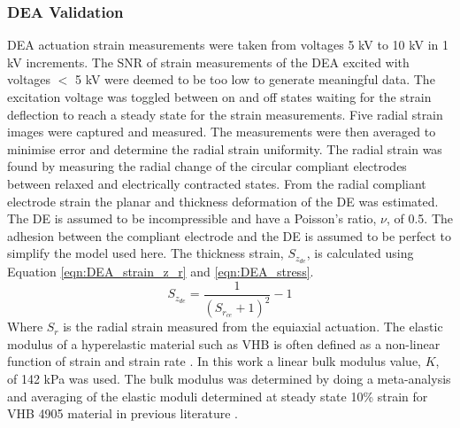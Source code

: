 \subsubsection{DEA Validation} %
\label{subsubsec:dea_validation1}
DEA actuation strain measurements were taken from voltages 5 kV to 10 kV in 1 kV increments. The SNR of strain measurements of the DEA excited with voltages $<$ 5 kV were deemed to be too low to generate meaningful data. The excitation voltage was toggled between on and off states waiting for the strain deflection to reach a steady state for the strain measurements. Five radial strain images were captured and measured. The measurements were then averaged to minimise error and determine the radial strain uniformity. The radial strain was found by measuring the radial change of the circular compliant electrodes between relaxed and electrically contracted states. From the radial compliant electrode strain the planar and thickness deformation of the DE was estimated. The DE is assumed to be incompressible and have a Poisson's ratio, $\nu$, of 0.5. The adhesion between the compliant electrode and the DE is assumed to be perfect to simplify the model used here. The thickness strain, $S_{z_{de}}$, is calculated using Equation \ref{eqn:DEA_strain_z_r} \cite{Carpi2015} and \ref{eqn:DEA_stress}.
\begin{equation}
	S_{z_{de}} = \frac{1}{(S_{r_{ce}} + 1)^2} - 1
	\label{eqn:DEA_strain_z_r}
\end{equation}
Where $S_r$ is the radial strain measured from the equiaxial actuation. 
The elastic modulus of a hyperelastic material such as VHB is often defined as a non-linear function of strain and strain rate \cite{Liu2018}. In this work a linear bulk modulus value, $K$, of 142 kPa was used. The bulk modulus was determined by doing a meta-analysis and averaging of the elastic moduli determined at steady state 10\% strain for VHB 4905 material in previous literature \cite{Liu2018, Helal2018, Huang2023}.
